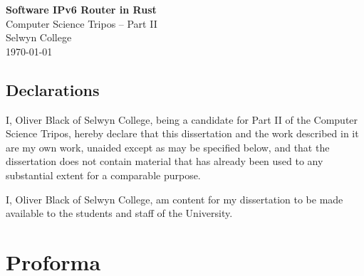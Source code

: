 \documentclass[12pt,a4paper,twoside,openany]{report}
\begin{document}





\pagestyle{empty}



\vspace*{60mm}
\begin{center}
\Huge
\textbf{Software IPv6 Router in Rust} \\[5mm]
Computer Science Tripos -- Part II \\[5mm]
Selwyn College \\[5mm]
\today  %
\end{center}

\newpage
{}
\section*{Declarations}

I, Oliver Black of Selwyn College, being a candidate for Part II of the Computer Science Tripos, hereby declare that this dissertation and the work described in it are my own work, unaided except as may be specified below, and that the dissertation does not contain material that has already been used to any substantial extent for a comparable purpose.

\bigskip
{}

\medskip
{}

\bigskip
\bigskip

\vfill
\noindent
I, Oliver Black of Selwyn College, am content for my dissertation to be made available to the students and staff of the University.

\bigskip
{}

\medskip
{}
\vspace{0.4\textheight}


\pagestyle{plain}

\chapter*{Proforma}
\end{document}
